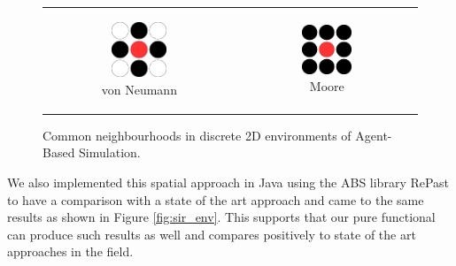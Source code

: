 \begin{figure}
\begin{center}
	\begin{tabular}{c c}
		\begin{subfigure}[b]{0.2\textwidth}
			\centering
			\includegraphics[width=0.5\textwidth, angle=0]{./fig/diagrams/neumann.png}
			\caption{von Neumann}
			\label{fig:neumann_neighbourhood}
		\end{subfigure}
    	&
		\begin{subfigure}[b]{0.2\textwidth}
			\centering
			\includegraphics[width=0.5\textwidth, angle=0]{./fig/diagrams/moore.png}
			\caption{Moore}
			\label{fig:moore_neighbourhood}
		\end{subfigure}
    \end{tabular}
	\caption{Common neighbourhoods in discrete 2D environments of Agent-Based Simulation.}
	\label{fig:abs_neighbourhoods}
\end{center}
\end{figure}

We also implemented this spatial approach in Java using the ABS library RePast \cite{north_complex_2013} to have a comparison with a state of the art approach and came to the same results as shown in Figure \ref{fig:sir_env}. This supports that our pure functional can produce such results as well and compares positively to state of the art approaches in the field.

